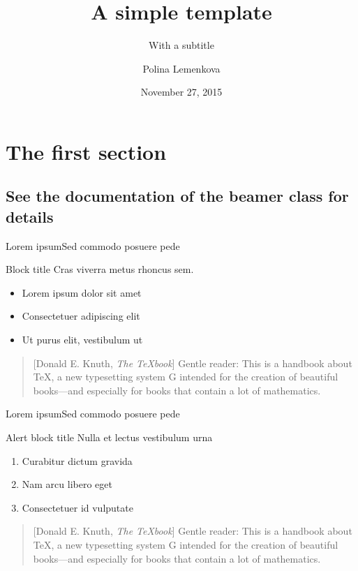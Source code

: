 \documentclass[10pt]{beamer}
\title{A simple template}
\subtitle{With a subtitle}
\author[Polina Lemenkova]{Polina Lemenkova}
\institute[University of Verona]{Department of Philology, Literature, and Linguistics\\
University of Verona}
\date{November 27, 2015}
\begin{document}
\maketitle

\section{The first section}

\subsection{See the documentation of the beamer class for details}

\begin{frame}[<+->]{Lorem ipsum}{Sed commodo posuere pede}

    \begin{block}{Block title}
    Cras viverra metus rhoncus sem.
    \end{block}
    
    \begin{itemize}
    	\item Lorem ipsum dolor sit amet
    	\item Consectetuer adipiscing elit
    	\item Ut purus elit, vestibulum ut
    \end{itemize}

\begin{quotation}[Donald E. Knuth, \emph{The \TeX book}]
Gentle reader: This is a handbook about \TeX, a new typesetting system G intended for the creation of beautiful books—and especially for books that contain a lot of mathematics.
\end{quotation}

\end{frame}
\begin{frame}{Lorem ipsum}{Sed commodo posuere pede}

    \begin{alertblock}{Alert block title}
    Nulla et lectus vestibulum urna   
    \end{alertblock}
    
    
    \begin{enumerate}[<+->]
    	\item Curabitur dictum gravida
    	\item Nam arcu libero eget
    	\item Consectetuer id vulputate
    \end{enumerate}

\begin{quotation}[Donald E. Knuth, \emph{The \TeX book}]
Gentle reader: This is a handbook about \TeX, a new typesetting system G intended for the creation of beautiful books—and especially for books that contain a lot of mathematics.
\end{quotation}

\end{frame}
\end{document}
